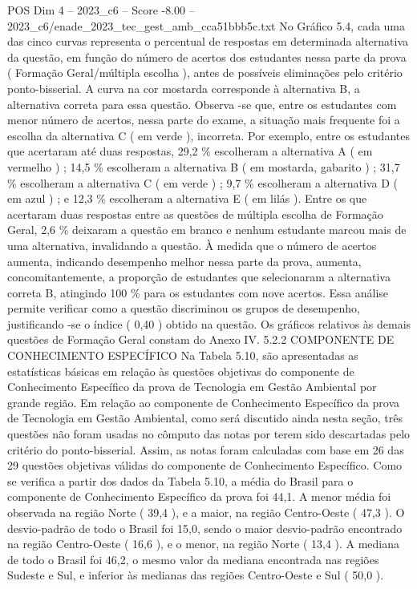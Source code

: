 \begin{textsample}{POS Dim 4 – 2023\_c6 – Score -8.00 – 2023\_c6/enade\_2023\_tec\_gest\_amb\_cca51bbb5c.txt}
No Gráfico 5.4, cada uma das cinco curvas representa o percentual de respostas em determinada alternativa da questão, em função do número de acertos dos estudantes nessa parte da prova ( Formação Geral/múltipla escolha ), antes de possíveis eliminações pelo critério ponto-bisserial.
A curva na cor mostarda corresponde à alternativa B, a alternativa correta para essa questão.
Observa -se que, entre os estudantes com menor número de acertos, nessa parte do exame, a situação mais frequente foi a escolha da alternativa C ( em verde ), incorreta.
Por exemplo, entre os estudantes que acertaram até duas respostas, 29,2 \% escolheram a alternativa A ( em vermelho ) ; 14,5 \% escolheram a alternativa B ( em mostarda, gabarito ) ; 31,7 \% escolheram a alternativa C ( em verde ) ; 9,7 \% escolheram a alternativa D ( em azul ) ; e 12,3 \% escolheram a alternativa E ( em lilás ).
Entre os que acertaram duas respostas entre as questões de múltipla escolha de Formação Geral, 2,6 \% deixaram a questão em branco e nenhum estudante marcou mais de uma alternativa, invalidando a questão.
À medida que o número de acertos aumenta, indicando desempenho melhor nessa parte da prova, aumenta, concomitantemente, a proporção de estudantes que selecionaram a alternativa correta B, atingindo 100 \% para os estudantes com nove acertos.
Essa análise permite verificar como a questão discriminou os grupos de desempenho, justificando -se o índice ( 0,40 ) obtido na questão.
Os gráficos relativos às demais questões de Formação Geral constam do Anexo IV. 5.2.2 COMPONENTE DE CONHECIMENTO ESPECÍFICO Na Tabela 5.10, são apresentadas as estatísticas básicas em relação às questões objetivas do componente de Conhecimento Específico da prova de Tecnologia em Gestão Ambiental por grande região.
Em relação ao componente de Conhecimento Específico da prova de Tecnologia em Gestão Ambiental, como será discutido ainda nesta seção, três questões não foram usadas no cômputo das notas por terem sido descartadas pelo critério do ponto-bisserial.
Assim, as notas foram calculadas com base em 26 das 29 questões objetivas válidas do componente de Conhecimento Específico.
Como se verifica a partir dos dados da Tabela 5.10, a média do Brasil para o componente de Conhecimento Específico da prova foi 44,1.
A menor média foi observada na região Norte ( 39,4 ), e a maior, na região Centro-Oeste ( 47,3 ).
O desvio-padrão de todo o Brasil foi 15,0, sendo o maior desvio-padrão encontrado na região Centro-Oeste ( 16,6 ), e o menor, na região Norte ( 13,4 ).
A mediana de todo o Brasil foi 46,2, o mesmo valor da mediana encontrada nas regiões Sudeste e Sul, e inferior às medianas das regiões Centro-Oeste e Sul ( 50,0 ).

\end{textsample}
